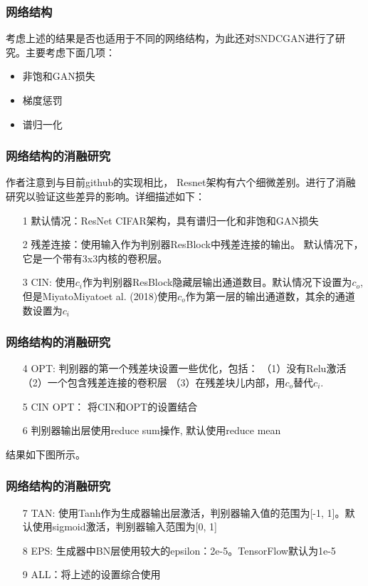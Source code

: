 \documentclass{beamer}
\begin{document}
\begin{frame}[c]\frametitle{网络结构}
    考虑上述的结果是否也适用于不同的网络结构，为此还对SNDCGAN进行了研究。主要考虑下面几项：
    \begin{itemize}
        \item 非饱和GAN损失
        \item 梯度惩罚
        \item 谱归一化
    \end{itemize}
\end{frame}

\begin{frame}[c]\frametitle{网络结构的消融研究}
    作者注意到与目前github的实现相比，
    Resnet架构有六个细微差别。进行了消融研究以验证这些差异的影响。详细描述如下：
    \begin{enumerate}
        \item[1] 默认情况：ResNet CIFAR架构，具有谱归一化和非饱和GAN损失
        \item[2] 残差连接：使用输入作为判别器ResBlock中残差连接的输出。 默认情况下，它是一个带有3x3内核的卷积层。
        \item[3] CIN: 使用$c_i$作为判别器ResBlock隐藏层输出通道数目。默认情况下设置为$c_o$, 但是MiyatoMiyatoet al. (2018)使用$c_o$作为第一层的输出通道数，其余的通道数设置为$c_i$
    \end{enumerate}
\end{frame}

\begin{frame}[c]\frametitle{网络结构的消融研究}
    \begin{enumerate}
        \item[4] OPT: 判别器的第一个残差块设置一些优化，包括：
        （1）没有Relu激活
        （2）一个包含残差连接的卷积层
        （3）在残差块儿内部，用$c_o$替代$c_i$.
        \item[5] CIN OPT： 将CIN和OPT的设置结合
        \item[6] 判别器输出层使用reduce sum操作, 默认使用reduce mean
    \end{enumerate}
    结果如下图所示。
\end{frame}


\begin{frame}[c]\frametitle{网络结构的消融研究}
    \begin{enumerate}
        \item[7] TAN: 使用Tanh作为生成器输出层激活，判别器输入值的范围为[-1, 1]。默认使用sigmoid激活，判别器输入范围为[0, 1]
        \item[8] EPS: 生成器中BN层使用较大的epsilon：2e-5。TensorFlow默认为1e-5
        \item[9] ALL：将上述的设置综合使用
    \end{enumerate}
\end{frame}
\end{document}
